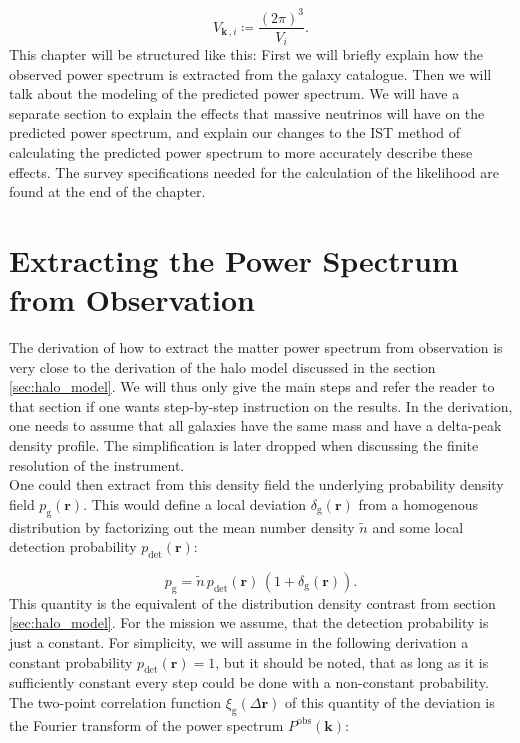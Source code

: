 \documentclass[../main.tex]{subfiles}
\begin{document}
\begin{equation*}
    \label{eq:lkl_spectro_v1}
    V_{\boldsymbol{k}\,,i} \coloneq \frac{(2\pi)^3}{V_{i}}.
\end{equation*}
This chapter will be structured like this: First we will briefly explain how the observed power spectrum is extracted from the galaxy catalogue. Then we will talk about the modeling of the predicted power spectrum. We will have a separate section to explain the effects that massive neutrinos will have on the predicted power spectrum, and explain our changes to the IST method of calculating the predicted power spectrum to more accurately describe these effects. The survey specifications needed for the calculation of the likelihood are found at the end of the chapter.

\section{Extracting the Power Spectrum from Observation}
The derivation of how to extract the matter power spectrum from observation is very close to the derivation of the halo model discussed in the section \ref{sec:halo_model}. We will thus only give the main steps and refer the reader to that section if one wants step-by-step instruction on the results. In the derivation, one needs to assume that all galaxies have the same mass and have a delta-peak density profile. The simplification is later dropped when discussing the finite resolution of the instrument.\\
One could then extract from this density field the underlying probability density field $p_\mathrm{g}(\boldsymbol{r})$. This would define a  local deviation $\delta_\mathrm{g}(\boldsymbol{r})$ from a homogenous distribution by factorizing out the mean number density $\tilde{n} $ and some local detection probability $p_\mathrm{det}(\boldsymbol{r})$: 

\begin{equation}
    p_\mathrm{g} = \tilde{n} \, p_\mathrm{det}(\boldsymbol{r}) \, \left( 1 + \delta_\mathrm{g}(\boldsymbol{r} )\right).
\end{equation}
This quantity is the equivalent of the distribution density contrast from section \ref{sec:halo_model}. For the \Euclid mission we assume, that the detection probability is just a constant. For simplicity, we will assume in the following derivation a constant probability $ p_\mathrm{det}(\boldsymbol{r})=1$, but it should be noted, that as long as it is sufficiently constant every step could be done with a non-constant probability.\\ 
The two-point correlation function $\xi_\mathrm{g}(\Delta\boldsymbol{r})$ of this quantity of the deviation is the Fourier transform of the power spectrum $P^\mathrm{obs}(\boldsymbol{k})$: 
\end{document}
